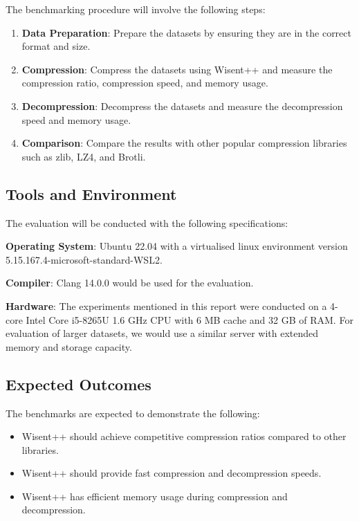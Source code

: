 The benchmarking procedure will involve the following steps:

\begin{enumerate}
   \item \textbf{Data Preparation}: Prepare the datasets by ensuring they are in the correct format and size.
   \item \textbf{Compression}: Compress the datasets using Wisent++ and measure the compression ratio, compression speed, and memory usage.
   \item \textbf{Decompression}: Decompress the datasets and measure the decompression speed and memory usage.
   \item \textbf{Comparison}: Compare the results with other popular compression libraries such as zlib, LZ4, and Brotli.
\end{enumerate}

\subsection{Tools and Environment}

The evaluation will be conducted with the following specifications:

\textbf{Operating System}: Ubuntu 22.04 with a virtualised linux environment version 5.15.167.4-microsoft-standard-WSL2.

\textbf{Compiler}: Clang 14.0.0 would be used for the evaluation.

\textbf{Hardware}: The experiments mentioned in this report were conducted on a 4-core Intel Core i5-8265U 1.6 GHz CPU with 6 MB cache and 32 GB of RAM. For evaluation of larger datasets, we would use a similar server with extended memory and storage capacity. 

\subsection{Expected Outcomes}

The benchmarks are expected to demonstrate the following:

\begin{itemize}
   \item Wisent++ should achieve competitive compression ratios compared to other libraries.
   \item Wisent++ should provide fast compression and decompression speeds.
   \item Wisent++ has efficient memory usage during compression and decompression.
\end{itemize}

